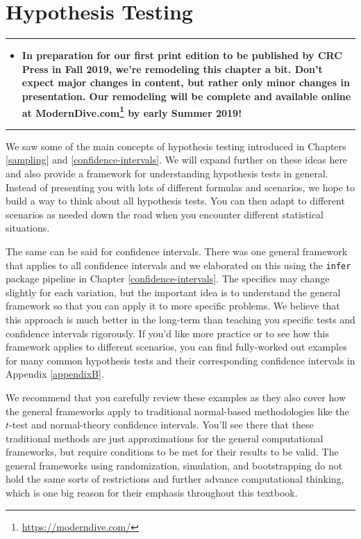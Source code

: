 \documentclass[12pt, krantz2,]{krantz}
\renewcommand{\href}[2]{#2\footnote{\url{#1}}}
\newenvironment{rmdblock}[1]
  {\begin{shaded*}
  \begin{itemize}
  \renewcommand{\labelitemi}{
    \raisebox{-.7\height}[0pt][0pt]{
    }
  }
  \item
  }
  {
  \end{itemize}
  \end{shaded*}
  }
\newenvironment{announcement}
  {\begin{rmdblock}{warning}}
  {\end{rmdblock}}
\begin{document}
\hypertarget{hypothesis-testing}{%
\chapter{Hypothesis Testing}\label{hypothesis-testing}}

\begin{center}\rule{0.5\linewidth}{\linethickness}\end{center}

\begin{announcement}
\textbf{In preparation for our first print edition to be published by
CRC Press in Fall 2019, we're remodeling this chapter a bit. Don't
expect major changes in content, but rather only minor changes in
presentation. Our remodeling will be complete and available online at
\href{https://moderndive.com/}{ModernDive.com} by early Summer 2019!}
\end{announcement}

\begin{center}\rule{0.5\linewidth}{\linethickness}\end{center}

We saw some of the main concepts of hypothesis testing introduced in Chapters \ref{sampling} and \ref{confidence-intervals}. We will expand further on these ideas here and also provide a framework for understanding hypothesis tests in general. Instead of presenting you with lots of different formulas and scenarios, we hope to build a way to think about all hypothesis tests. You can then adapt to different scenarios as needed down the road when you encounter different statistical situations.

The same can be said for confidence intervals. There was one general framework that applies to all confidence intervals and we elaborated on this using the \texttt{infer} package pipeline in Chapter \ref{confidence-intervals}. The specifics may change slightly for each variation, but the important idea is to understand the general framework so that you can apply it to more specific problems. We believe that this approach is much better in the long-term than teaching you specific tests and confidence intervals rigorously. If you'd like more practice or to see how this framework applies to different scenarios, you can find fully-worked out examples for many common hypothesis tests and their corresponding confidence intervals in Appendix \ref{appendixB}.

We recommend that you carefully review these examples as they also cover how the general frameworks apply to traditional normal-based methodologies like the \(t\)-test and normal-theory confidence intervals. You'll see there that these traditional methods are just approximations for the general computational frameworks, but require conditions to be met for their results to be valid. The general frameworks using randomization, simulation, and bootstrapping do not hold the same sorts of restrictions and further advance computational thinking, which is one big reason for their emphasis throughout this textbook.
\end{document}
